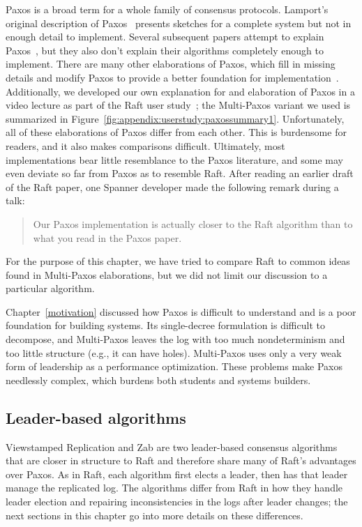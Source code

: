 Paxos is a broad term for a whole family of consensus protocols.
Lamport's original description of Paxos~\cite{Lamport:1998}
presents sketches for a complete system but not in
enough detail to implement.
Several subsequent papers attempt to explain Paxos~\cite{Lamport:2001,
Lampson:1996, Lampson:2001}, but they also
don't explain their algorithms completely enough to implement. There are
many other elaborations of Paxos, which fill in missing details and
modify Paxos to provide a better foundation for
implementation~\cite{Renesse:2011, Kirsch:2008}. Additionally, we
developed our own explanation for and elaboration of Paxos in a video
lecture as part of the Raft user study~\cite{study}; the Multi-Paxos
variant we used is summarized in
Figure~\ref{fig:appendix:userstudy:paxossummary1}. Unfortunately, all of
these elaborations of Paxos differ from each other. This is burdensome
for readers, and it also makes comparisons difficult.
%
Ultimately, most implementations bear little resemblance to the Paxos
literature, and some may even deviate so far from Paxos as to resemble Raft.
After reading an earlier draft of the Raft paper, one Spanner developer
made the following remark during a talk:
%
\begin{quote}
%
Our Paxos implementation is actually closer to the Raft algorithm than
to what you read in the Paxos paper.~\cite{Kanthak:2013}
%
\end{quote}
%
For the purpose of
this chapter, we have tried to compare Raft to common ideas found in
Multi-Paxos elaborations, but we did not limit our discussion to a
particular algorithm.

Chapter~\ref{motivation} discussed how Paxos is difficult to understand
and is a poor foundation for building systems. Its single-decree
formulation is difficult to decompose, and Multi-Paxos leaves the log
with too much nondeterminism and too little structure (e.g., it can have
holes). Multi-Paxos uses only a very weak form of leadership as a
performance optimization. These problems make Paxos needlessly complex,
which burdens both students and systems builders.

\subsection{Leader-based algorithms}

Viewstamped Replication and Zab are two leader-based consensus
algorithms that are closer in structure to Raft and therefore share many
of Raft's advantages over Paxos. As in Raft, each algorithm first elects
a leader, then has that leader manage the replicated log. The algorithms
differ from Raft in how they handle leader election and repairing
inconsistencies in the logs after leader changes; the next sections
in this chapter go into more details on these differences.

